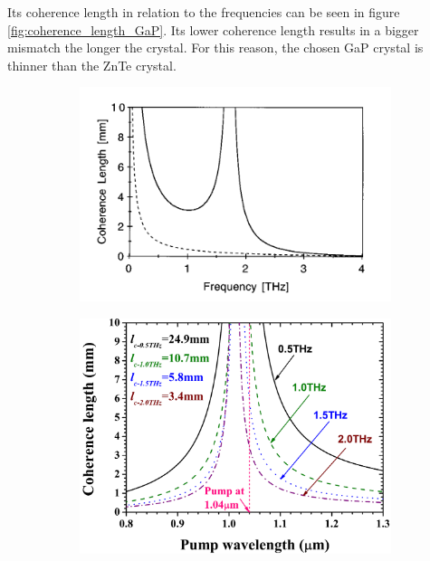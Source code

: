 Its coherence length in relation to the frequencies can be seen in figure \ref{fig:coherence_length_GaP}.
Its lower coherence length results in a bigger mismatch the longer the crystal.
For this reason, the chosen GaP crystal is thinner than the ZnTe crystal.
\begin{figure}
    \centering
    \begin{subfigure}{.5\textwidth}%
        \centering
        \includegraphics[width=\textwidth]{refferenced_pic/coherence_length_ZnTe.png}
        \caption{}
        \label{fig:coherence_legnth}
    \end{subfigure}%
    \hfill
    \begin{subfigure}{.5\textwidth}%
        \centering
        \includegraphics[width=\textwidth]{PLots/GAP_coherencelength.png}

\end{subfigure}
\end{figure}
